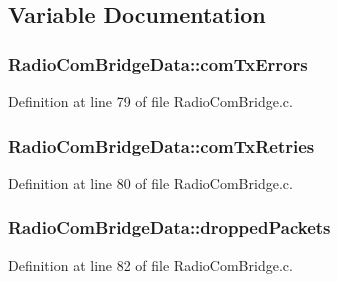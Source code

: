 \subsection{Variable Documentation}
\hypertarget{group___radio_com_bridge_module_ga70614241d844e1b9501d0ba2fee0d2a3}{
\subsubsection[{com\-Tx\-Errors}]{ Radio\-Com\-Bridge\-Data\-::com\-Tx\-Errors}}\label{group___radio_com_bridge_module_ga70614241d844e1b9501d0ba2fee0d2a3}


Definition at line 79 of file Radio\-Com\-Bridge.\-c.

\hypertarget{group___radio_com_bridge_module_ga392e64420cac274586464b5173287ddd}{
\subsubsection[{com\-Tx\-Retries}]{ Radio\-Com\-Bridge\-Data\-::com\-Tx\-Retries}}\label{group___radio_com_bridge_module_ga392e64420cac274586464b5173287ddd}


Definition at line 80 of file Radio\-Com\-Bridge.\-c.

\hypertarget{group___radio_com_bridge_module_gafe94f8af161cf4629a276387f1b0bca6}{
\subsubsection[{dropped\-Packets}]{ Radio\-Com\-Bridge\-Data\-::dropped\-Packets}}\label{group___radio_com_bridge_module_gafe94f8af161cf4629a276387f1b0bca6}


Definition at line 82 of file Radio\-Com\-Bridge.\-c.

